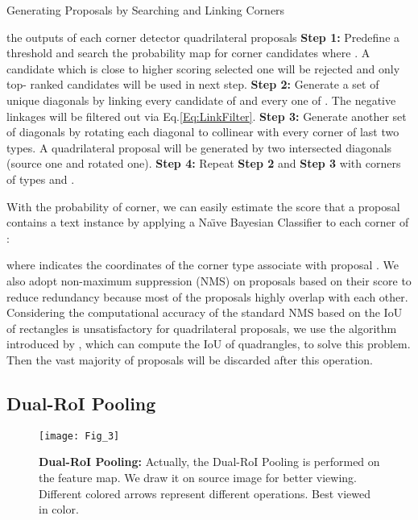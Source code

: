 \documentclass[3p, times]{elsarticle}
\begin{document}
\begin{algorithm}
	\renewcommand{\algorithmicrequire}{\textbf{Input:}}
	\renewcommand{\algorithmicensure}{\textbf{Output:}}
	\caption{Generating Proposals by Searching and Linking Corners}
	\label{Alg_1}
	\begin{algorithmic}
		\REQUIRE the outputs of each corner detector
		\ENSURE quadrilateral proposals
		\STATE \textbf{Step 1:} Predefine a threshold  and search the probability map for corner candidates where . A candidate which is close to higher scoring selected one will be rejected and only top- ranked candidates will be used in next step. 
		\STATE \textbf{Step 2:} Generate a set of unique diagonals by linking every candidate of  and every one of . The negative linkages will be filtered out via Eq.\ref{Eq:LinkFilter}. 
		\STATE \textbf{Step 3:} Generate another set of diagonals by rotating each diagonal to collinear with every corner of last two types. A quadrilateral proposal will be generated by two intersected diagonals (source one and rotated one). 
		\STATE \textbf{Step 4:} Repeat \textbf{Step 2} and \textbf{Step 3} with corners of types  and .
	\end{algorithmic}  
\end{algorithm}




With the probability of corner, we can easily estimate the score that a proposal  contains a text instance by applying a Na{\"\i}ve Bayesian Classifier to each corner of :



\noindent where  indicates the coordinates of the corner type  associate with proposal . We also adopt non-maximum suppression (NMS) on proposals based on their score to reduce redundancy because most of the proposals highly overlap with each other. Considering the computational accuracy of the standard NMS based on the IoU of rectangles is unsatisfactory for quadrilateral proposals, we use the algorithm introduced by \cite{RRPN2017ARXIV}, which can compute the IoU of quadrangles, to solve this problem. Then the vast majority of proposals will be discarded after this operation. 




\subsection{Dual-RoI Pooling}

\begin{figure}[!htb]
\centering
\texttt{[image: Fig\_3]}
\caption{\textbf{Dual-RoI Pooling:} Actually, the Dual-RoI Pooling is performed on the feature map. We draw it on source image for better viewing. Different colored arrows represent different operations. Best viewed in color.}
\label{Fig_3}
\end{figure}
\end{document}
